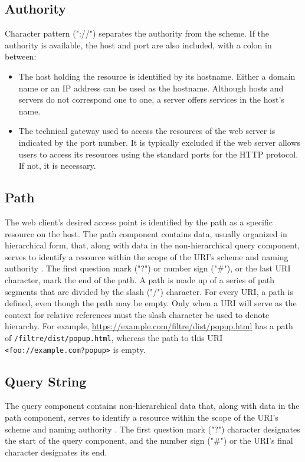 \subsection*{Authority}
Character pattern ("://") separates the authority from the scheme. If the authority is available, the host and port are also included, with a colon in between:

\begin{itemize}
  \item The host holding the resource is identified by its hostname. Either a domain name or an IP address can be used as the hostname. Although hosts and servers do not correspond one to one, a server offers services in the host's name.
  \item The technical gateway used to access the resources of the web server is indicated by the port number. It is typically excluded if the web server allows users to access its resources using the standard ports for the HTTP protocol. If not, it is necessary.
\end{itemize}

\subsection*{Path}
The web client's desired access point is identified by the path as a specific resource on the host. The path component contains data, usually organized in hierarchical form, that, along with data in the non-hierarchical query component, serves to identify a resource within the scope of the URI's scheme and naming authority \autocite{berners2005uniform}. The first question mark ("?") or number sign ("\#"), or the last URI character, mark the end of the path. A path is made up of a series of path segments that are divided by the slash ("/") character. For every URI, a path is defined, even though the path may be empty. Only when a URI will serve as the context for relative references must the slash character be used to denote hierarchy. For example, \url{https://example.com/filtre/dist/popup.html} has a path of \texttt{/filtre/dist/popup.html}, whereas the path to this URI \texttt{<foo://example.com?popup>} is empty.

\subsection*{Query String}
The query component contains non-hierarchical data that, along with data in the path component, serves to identify a resource within the scope of the URI's scheme and naming authority \autocite{berners2005uniform}. The first question mark ("?") character designates the start of the query component, and the number sign ("\#") or the URI's final character designates its end.

